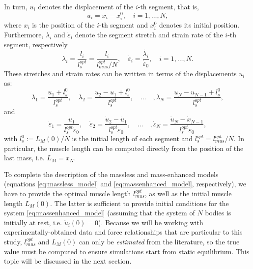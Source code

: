 \documentclass{sfuthesis}
\numberwithin{equation}{chapter}
\numberwithin{figure}{chapter}
\numberwithin{table}{chapter}
\theoremstyle{definition}
\newcommand{\depsilon}{\dot{\varepsilon}}
\begin{document}
In turn, $u_i$ denotes the displacement of the $i$-th segment, that is,
\begin{equation}
    u_i = x_i - x_i^0, \quad i=1,\dots,N,
\end{equation}
where $x_i$ is the position of the $i$-th segment and $x_i^0$ denotes its initial position. Furthermore, $\lambda_i$ and $\depsilon_i$ denote the segment stretch and strain rate of the $i$-th segment, respectively
\[
\lambda_i = \dfrac{l_i}{l_s^{opt}} = \dfrac{l_i}{l_{mus}^{opt}/N}, \quad \depsilon_i = \dfrac{\dot{\lambda_i}}{\depsilon_0}, \quad i = 1,\dots,N.
\]
These stretches and strain rates can be written in terms of the displacements $u_i$ as:
\begin{equation}
    \lambda_1 = \dfrac{u_1 + l_s^0}{l_s^{opt}}, \quad \lambda_2 = \dfrac{u_2-u_1 + l_s^0}{l_s^{opt}}, \quad \dots \quad, \lambda_N = \dfrac{u_N-u_{N-1} + l_s^0}{l_s^{opt}},
\end{equation}
and
\begin{equation}
    \depsilon_1 = \dfrac{\dot{u}_1}{l_s^{opt} \depsilon_0}, \quad \depsilon_2 = \dfrac{\dot{u}_2-\dot{u}_1}{l_s^{opt} \depsilon_0}, \quad \dots \quad, \depsilon_N = \dfrac{\dot{u}_N - \dot{x}_{N-1}}{l_s^{opt} \depsilon_0},
\end{equation}
with $l_s^0 := L_M(0)/N$ is the initial length of each segment and $l_s^{opt} = l_{mus}^{opt}/N$. In particular, the muscle length can be computed directly from the position of the last mass, i.e. $L_M = x_N$.

To complete the description of the massless and mass-enhanced models (equations \eqref{eq:massless_model} and \eqref{eq:massenhanced_model}, respectively), we have to provide the optimal muscle length $l_{mus}^{opt}$, as well as the initial muscle length $L_M(0)$. The latter is sufficient to provide initial conditions for the system \eqref{eq:massenhanced_model} (assuming that the system of $N$ bodies is initially at rest, i.e. $\dot{u}_i(0) = 0$). Because we will be working with experimentally-obtained data and force relationships that are particular to this study, $l_{mus}^{opt}$ and $L_M(0)$ can only be \textit{estimated} from the literature, so the true value must be computed to ensure simulations start from static equilibrium. This topic will be discussed in the next section.
\end{document}
